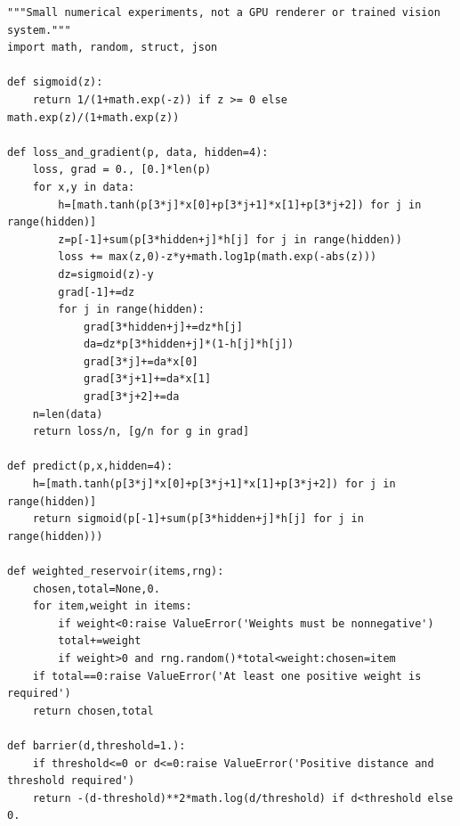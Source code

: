 \begin{verbatim}
"""Small numerical experiments, not a GPU renderer or trained vision system."""
import math, random, struct, json

def sigmoid(z):
    return 1/(1+math.exp(-z)) if z >= 0 else math.exp(z)/(1+math.exp(z))

def loss_and_gradient(p, data, hidden=4):
    loss, grad = 0., [0.]*len(p)
    for x,y in data:
        h=[math.tanh(p[3*j]*x[0]+p[3*j+1]*x[1]+p[3*j+2]) for j in range(hidden)]
        z=p[-1]+sum(p[3*hidden+j]*h[j] for j in range(hidden))
        loss += max(z,0)-z*y+math.log1p(math.exp(-abs(z)))
        dz=sigmoid(z)-y
        grad[-1]+=dz
        for j in range(hidden):
            grad[3*hidden+j]+=dz*h[j]
            da=dz*p[3*hidden+j]*(1-h[j]*h[j])
            grad[3*j]+=da*x[0]
            grad[3*j+1]+=da*x[1]
            grad[3*j+2]+=da
    n=len(data)
    return loss/n, [g/n for g in grad]

def predict(p,x,hidden=4):
    h=[math.tanh(p[3*j]*x[0]+p[3*j+1]*x[1]+p[3*j+2]) for j in range(hidden)]
    return sigmoid(p[-1]+sum(p[3*hidden+j]*h[j] for j in range(hidden)))

def weighted_reservoir(items,rng):
    chosen,total=None,0.
    for item,weight in items:
        if weight<0:raise ValueError('Weights must be nonnegative')
        total+=weight
        if weight>0 and rng.random()*total<weight:chosen=item
    if total==0:raise ValueError('At least one positive weight is required')
    return chosen,total

def barrier(d,threshold=1.):
    if threshold<=0 or d<=0:raise ValueError('Positive distance and threshold required')
    return -(d-threshold)**2*math.log(d/threshold) if d<threshold else 0.


\end{verbatim}
